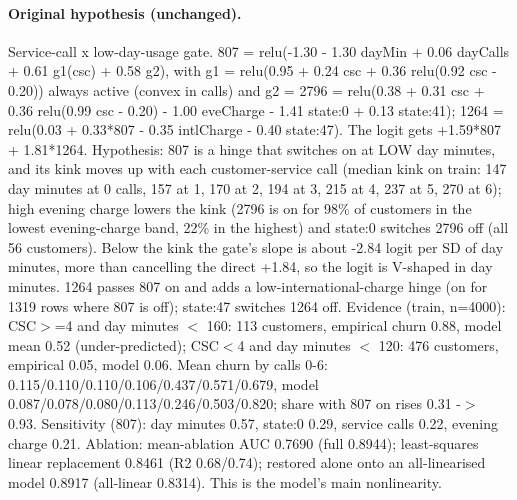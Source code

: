 \documentclass[a4paper,10pt]{article}
\newif\ifreviewmarks
\newcommand{\reviewrule}{\noindent{\color{BrickRed}\rule{\linewidth}{0.8pt}}}
\newenvironment{drafted}[1][]{%
  \ifreviewmarks\par\addvspace{\medskipamount}\reviewrule\par\nopagebreak
  \noindent{\color{BrickRed}\sffamily\footnotesize\textbf{Thesis Draft}\quad #1\hfill review}\par\nopagebreak\smallskip\fi}{%
  \ifreviewmarks\par\smallskip\noindent{\color{BrickRed}\sffamily\footnotesize end of thesis draft}\par\nopagebreak\reviewrule\par\medskip\fi}
\begin{document}
\begin{drafted}[plain-language layer: churn100-s2-c2]
\paragraph{Original hypothesis (unchanged).} Service-call x low-day-usage gate. 807 = relu(-1.30 - 1.30 dayMin + 0.06 dayCalls + 0.61 g1(csc) + 0.58 g2), with g1 = relu(0.95 + 0.24 csc + 0.36 relu(0.92 csc - 0.20)) always active (convex in calls) and g2 = 2796 = relu(0.38 + 0.31 csc + 0.36 relu(0.99 csc - 0.20) - 1.00 eveCharge - 1.41 state:0 + 0.13 state:41); 1264 = relu(0.03 + 0.33*807 - 0.35 intlCharge - 0.40 state:47). The logit gets +1.59*807 + 1.81*1264. Hypothesis: 807 is a hinge that switches on at LOW day minutes, and its kink moves up with each customer-service call (median kink on train: 147 day minutes at 0 calls, 157 at 1, 170 at 2, 194 at 3, 215 at 4, 237 at 5, 270 at 6); high evening charge lowers the kink (2796 is on for 98\% of customers in the lowest evening-charge band, 22\% in the highest) and state:0 switches 2796 off (all 56 customers). Below the kink the gate's slope is about -2.84 logit per SD of day minutes, more than cancelling the direct +1.84, so the logit is V-shaped in day minutes. 1264 passes 807 on and adds a low-international-charge hinge (on for 1319 rows where 807 is off); state:47 switches 1264 off. Evidence (train, n=4000): CSC$>$=4 and day minutes $<$ 160: 113 customers, empirical churn 0.88, model mean 0.52 (under-predicted); CSC$<$4 and day minutes $<$ 120: 476 customers, empirical 0.05, model 0.06. Mean churn by calls 0-6: 0.115/\allowbreak{}0.110/\allowbreak{}0.110/\allowbreak{}0.106/\allowbreak{}0.437/\allowbreak{}0.571/\allowbreak{}0.679,\allowbreak{} model 0.087/\allowbreak{}0.078/\allowbreak{}0.080/\allowbreak{}0.113/\allowbreak{}0.246/\allowbreak{}0.503/\allowbreak{}0.820;\allowbreak{} share with 807 on rises 0.31 -$>$ 0.93. Sensitivity (807): day minutes 0.57, state:0 0.29, service calls 0.22, evening charge 0.21. Ablation: mean-ablation AUC 0.7690 (full 0.8944); least-squares linear replacement 0.8461 (R2 0.68/0.74); restored alone onto an all-linearised model 0.8917 (all-linear 0.8314). This is the model's main nonlinearity.

\end{drafted}
\end{document}
